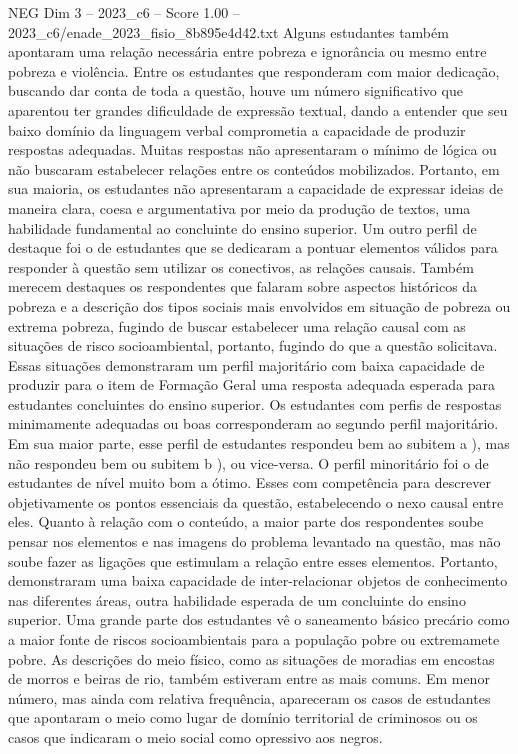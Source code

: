 \begin{textsample}{NEG Dim 3 – 2023\_c6 – Score 1.00 – 2023\_c6/enade\_2023\_fisio\_8b895e4d42.txt}
Alguns estudantes também apontaram uma relação necessária entre pobreza e ignorância ou mesmo entre pobreza e violência.
Entre os estudantes que responderam com maior dedicação, buscando dar conta de toda a questão, houve um número significativo que aparentou ter grandes dificuldade de expressão textual, dando a entender que seu baixo domínio da linguagem verbal comprometia a capacidade de produzir respostas adequadas.
Muitas respostas não apresentaram o mínimo de lógica ou não buscaram estabelecer relações entre os conteúdos mobilizados.
Portanto, em sua maioria, os estudantes não apresentaram a capacidade de expressar ideias de maneira clara, coesa e argumentativa por meio da produção de textos, uma habilidade fundamental ao concluinte do ensino superior.
Um outro perfil de destaque foi o de estudantes que se dedicaram a pontuar elementos válidos para responder à questão sem utilizar os conectivos, as relações causais.
Também merecem destaques os respondentes que falaram sobre aspectos históricos da pobreza e a descrição dos tipos sociais mais envolvidos em situação de pobreza ou extrema pobreza, fugindo de buscar estabelecer uma relação causal com as situações de risco socioambiental, portanto, fugindo do que a questão solicitava.
Essas situações demonstraram um perfil majoritário com baixa capacidade de produzir para o item de Formação Geral uma resposta adequada esperada para estudantes concluintes do ensino superior.
Os estudantes com perfis de respostas minimamente adequadas ou boas corresponderam ao segundo perfil majoritário.
Em sua maior parte, esse perfil de estudantes respondeu bem ao subitem a ), mas não respondeu bem ou subitem b ), ou vice-versa.
O perfil minoritário foi o de estudantes de nível muito bom a ótimo.
Esses com competência para descrever objetivamente os pontos essenciais da questão, estabelecendo o nexo causal entre eles.
Quanto à relação com o conteúdo, a maior parte dos respondentes soube pensar nos elementos e nas imagens do problema levantado na questão, mas não soube fazer as ligações que estimulam a relação entre esses elementos.
Portanto, demonstraram uma baixa capacidade de inter-relacionar objetos de conhecimento nas diferentes áreas, outra habilidade esperada de um concluinte do ensino superior.
Uma grande parte dos estudantes vê o saneamento básico precário como a maior fonte de riscos socioambientais para a população pobre ou extremamete pobre.
As descrições do meio físico, como as situações de moradias em encostas de morros e beiras de rio, também estiveram entre as mais comuns.
Em menor número, mas ainda com relativa frequência, apareceram os casos de estudantes que apontaram o meio como lugar de domínio territorial de criminosos ou os casos que indicaram o meio social como opressivo aos negros.

\end{textsample}
